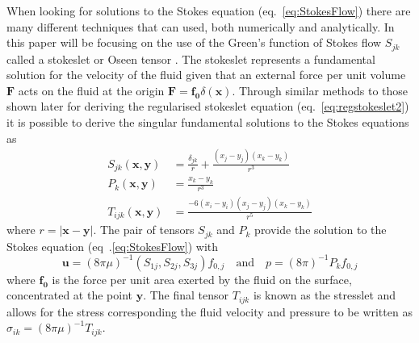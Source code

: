 When looking for solutions to the Stokes equation (eq.~\ref{eq:StokesFlow}) there are many different techniques that can used, both numerically and analytically. In this paper will be focusing on the use of the Green's function of Stokes flow $S_{jk}$ called a stokeslet\cite{Pozrikidis1992BoundaryFlow,Hancock1953TheLiquids} or Oseen tensor \cite{Oseen1927NeuereHydrodynamik}. The stokeslet represents a fundamental solution for the velocity of the fluid given that an external force per unit volume $\bm{F}$ acts on the fluid at the origin $\bm{F} = \bm{f_0}\delta(\bm{x})$\cite{Hancock1953TheLiquids, Batchelor2000AnDynamics}.
Through similar methods to those shown later for deriving the regularised stokeslet equation (eq.~\ref{eq:regstokeslet2}) it is possible to derive the singular fundamental solutions to the Stokes equations as
\begin{equation}
\label{eq:singularsolutions}
\begin{aligned}
    S_{j k}(\bm{x}, \bm{y}) &= \frac{\delta_{j k}}{r}+\frac{\left(x_{j}-y_{j}\right)\left(x_{k}-y_{k}\right)}{r^{3}} \\
    P_{k}(\bm{x}, \bm{y}) &= \frac{x_{k}-y_{k}}{r^{3}} \\
    T_{ijk}(\bm{x}, \bm{y}) &= \frac{-6\left(x_{i}-y_{i}\right)\left(x_{j}-y_{j}\right)\left(x_{k}-y_{k}\right)}{r^5}
\end{aligned}
\end{equation}
where $r=|\bm{x}-\bm{y}|$. The pair of tensors $S_{jk}$ and $P_k$ provide the solution to the Stokes equation (eq~.\ref{eq:StokesFlow}) with
\begin{equation*}
    \mathbf{u} = (8 \pi \mu)^{-1} \left(S_{1j},S_{2j},S_{3j}\right)f_{0,j} \quad \text{and} \quad p = (8 \pi)^{-1} P_k f_{0,j} 
\end{equation*}
where $\bm{f_{0}}$ is the force per unit area exerted by the fluid on the surface, concentrated at the point $\bm{y}$. The final tensor $T_{ijk}$ is known as the stresslet and allows for the stress corresponding the fluid velocity and pressure to be written as $\sigma_{ik}=(8 \pi \mu)^{-1}T_{ijk}$. 

